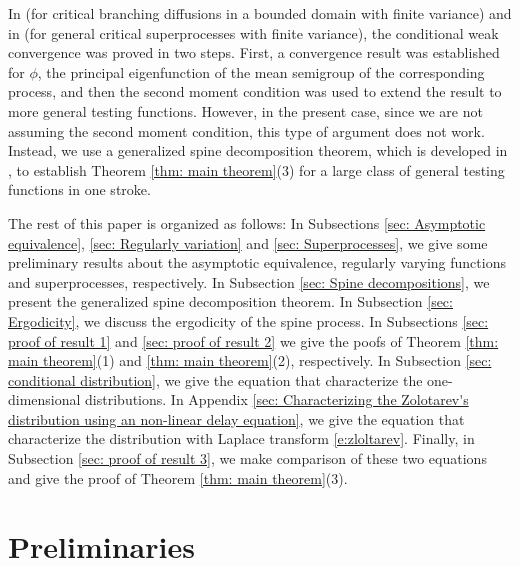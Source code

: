 \documentclass[12pt,a4paper]{amsart}
\theoremstyle{definition}
\numberwithin{equation}{section}
\begin{document}
In \cite{Powell2015An-invariance} (for critical branching diffusions in a bounded domain with finite variance) and in \cite{RenSongSun2017Spine, RenSongZhang2015Limit} (for general critical superprocesses with finite variance), the conditional weak convergence was proved in two steps.
First, a convergence result was established for $\phi$, the principal eigenfunction of the mean semigroup of the corresponding process, and then the second moment condition was used to extend the result to more general testing functions.
However, in the present case, since we are not assuming the second moment condition, this type of argument does not work.
Instead, we use a generalized spine decomposition theorem, which is developed in \cite{RenSongSun2017Spine}, to establish Theorem \ref{thm: main theorem}(3) for a large class of general testing functions in one stroke.

The rest of this paper is organized as follows:
In Subsections \ref{sec: Asymptotic equivalence}, \ref{sec: Regularly variation} and \ref{sec: Superprocesses}, we give some preliminary results about the asymptotic equivalence, regularly varying functions and superprocesses, respectively.
In Subsection \ref{sec: Spine decompositions}, we present the generalized spine decomposition theorem.
In Subsection \ref{sec: Ergodicity}, we discuss the ergodicity of the spine process.
In Subsections \ref{sec: proof of result 1} and \ref{sec: proof of result 2} we give the poofs of Theorem \ref{thm: main theorem}(1) and \ref{thm: main theorem}(2), respectively.
In Subsection \ref{sec: conditional distribution}, we give the equation that characterize the one-dimensional distributions.
In Appendix \ref{sec: Characterizing the Zolotarev's distribution using an non-linear delay equation}, we give the equation that characterize the distribution with Laplace transform \eqref{e:zloltarev}.
Finally, in Subsection \ref{sec: proof of result 3}, we make comparison of these two equations and give the proof of Theorem \ref{thm: main theorem}(3).

\section{Preliminaries} \label{sec: Preliminaries}
\end{document}
